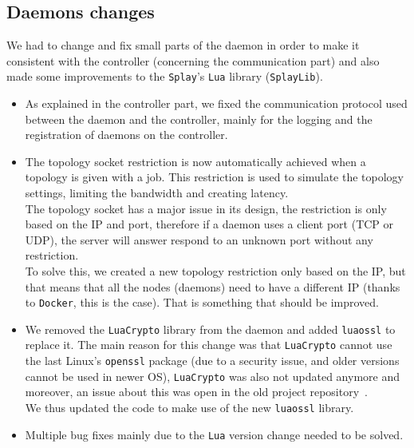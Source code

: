 \documentclass{eplmastersthesis}
\begin{document}
      \subsection{Daemons changes}

        We had to change and fix small parts of the daemon in order to make
        it consistent with the controller (concerning the communication part)
        and also made some improvements to the \texttt{Splay}'s \texttt{Lua} library (\texttt{SplayLib}).

        \begin{itemize}
          \item As explained in the controller part, we fixed the communication
          protocol used between the daemon and the controller, mainly for
          the logging and the registration of daemons on the controller.
          \item The topology socket restriction is now automatically achieved
          when a topology is given with a job. This restriction is used to
          simulate the topology settings, limiting the bandwidth and creating
          latency.\\
          The topology socket has a major issue in its design, the restriction
          is only based on the IP and port, therefore if a daemon uses a client
          port (TCP or UDP), the server will answer respond to an unknown port
          without any restriction.\\
          To solve this, we created a new topology restriction only based on
          the IP, but that means that all the nodes (daemons) need to have a
          different IP (thanks to \texttt{Docker}, this is the case). That is
          something that should be improved.
          \item We removed the \texttt{LuaCrypto} library from the daemon and added
          \texttt{luaossl} to replace it. The main reason for this change was that
          \texttt{LuaCrypto} cannot use the last Linux's \texttt{openssl} package (due to a
          security issue, and older versions cannot be used in newer OS),
          \texttt{LuaCrypto} was also not updated anymore and moreover, an issue about
          this was open in the old project repository~\cite{sslLib}.\\
          We thus updated the code to make use of the new \texttt{luaossl} library.
          \item Multiple bug fixes mainly due to the \texttt{Lua} version change needed
          to be solved.
        \end{itemize}
\end{document}
